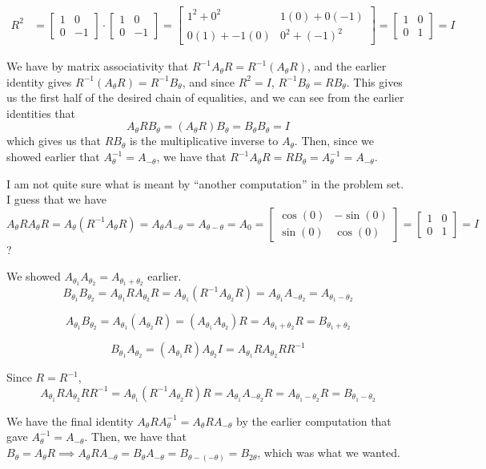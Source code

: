 \documentclass[12pt,letterpaper]{article}
\theoremstyle{definition}
\begin{document}
\begin{align*}
  R^2 &=
  \begin{bmatrix}
    1 & 0 \\
    0 & -1
  \end{bmatrix} \cdot
  \begin{bmatrix}
    1 & 0 \\
    0 & -1
  \end{bmatrix} = 
  \begin{bmatrix}
    1^2 + 0^2 & 1(0) + 0(-1) \\
    0(1) + -1(0) & 0^2 + (-1)^2
  \end{bmatrix} = 
  \begin{bmatrix}
    1 & 0 \\
    0 & 1
  \end{bmatrix} = I
\end{align*}

We have by matrix associativity that $R^{-1}A_\theta R = R^{-1}(A_\theta R)$,
and the earlier identity gives $R^{-1}(A_\theta R) = R^{-1}B_\theta$, and since
$R^2 = I$, $R^{-1}B_\theta = RB_\theta$. This gives us the first half of the
desired chain of equalities, and we can see from the earlier identities that
\[
  A_\theta R B_\theta = (A_\theta R)B_\theta = B_\theta B_\theta = I
\]
which gives us that $RB_\theta$ is the multiplicative inverse to $A_\theta$.
Then, since we showed earlier that $A^{-1}_\theta = A_{-\theta}$, we have that
$R^{-1}A_\theta R = RB_\theta = A_\theta^{-1} = A_{-\theta}$.

I am not quite sure what is meant by ``another computation''  in the problem
set. I guess that we have $A_\theta R A_\theta R = A_\theta (R^{-1} A_\theta R) =
  A_\theta A_{-\theta} = A_{\theta - \theta} = A_0 = \begin{bmatrix}\cos(0) &
  -\sin(0) \\ \sin(0) & \cos(0) \end{bmatrix} = \begin{bmatrix} 1 & 0 \\ 0 & 1
\end{bmatrix} = I$?

We showed $A_{\theta_1}A_{\theta_2} = A_{\theta_1 + \theta_2}$ earlier.
\[
  B_{\theta_1}B_{\theta_2} = A_{\theta_1}R A_{\theta_2}R =
  A_{\theta_1}(R^{-1}A_{\theta_2}R) = A_{\theta_1}A_{-\theta_2} = A_{\theta_1 -
  \theta_2}
\]

\[
  A_{\theta_1}B_{\theta_2} = A_{\theta_1}(A_{\theta_2}R) =
  (A_{\theta_1}A_{\theta_2})R = A_{\theta_1 + \theta_2}R = B_{\theta_1 +
  \theta_2}
\]

\[
  B_{\theta_1}A_{\theta_2} = (A_{\theta_1}R)A_{\theta_2}I =
  A_{\theta_1}RA_{\theta_2}RR^{-1}
\]

Since $R = R^{-1}$, 
\[
  A_{\theta_1}RA_{\theta_2}RR^{-1} = A_{\theta_1}(R^{-1}A_{\theta_2}R)R =
  A_{\theta_1}A_{-\theta_2}R = A_{\theta_1 - \theta_2}R = B_{\theta_1 -
  \theta_2}
\]

We have the final identity $A_\theta R A_\theta^{-1} = A_\theta R A_{-\theta}$
by the earlier computation that gave $A_\theta^{-1} = A_{-\theta}$. Then, we
have that $B_\theta = A_\theta R \implies A_\theta R A_{-\theta} = B_\theta
A_{-\theta} = B_{\theta - (-\theta)} = B_{2\theta}$, which was what we wanted.
\end{document}
